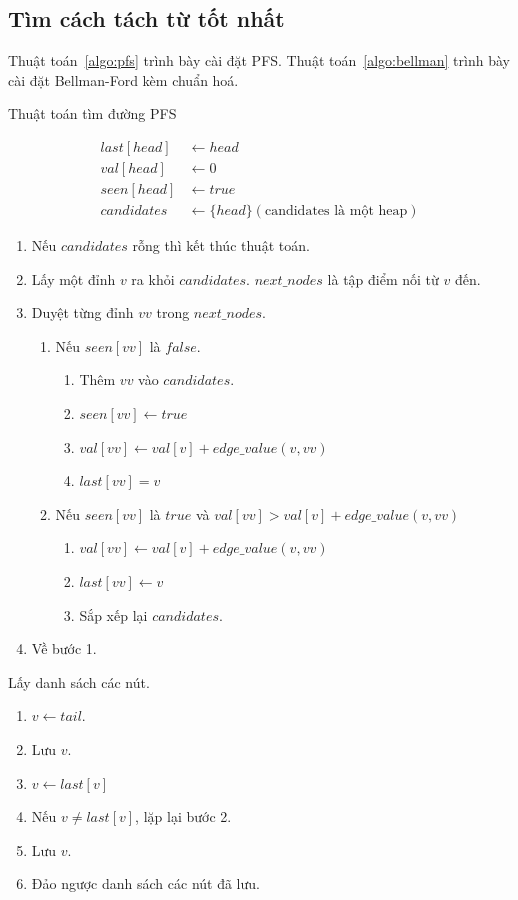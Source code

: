 \documentclass[a4paper,oneside,14pt]{extbook} %
\begin{document}
\subsection{Tìm cách tách từ tốt nhất}


Thuật toán~\ref{algo:pfs} trình bày cài đặt PFS. 
Thuật toán~\ref{algo:bellman} trình bày cài đặt Bellman-Ford kèm chuẩn hoá.


\begin{algo}
  \caption{Thuật toán tìm đường PFS}
  \label{algo:pfs}
  \begin{align*}
    last[head] &\leftarrow head\\
    val[head] &\leftarrow 0\\
    seen[head] &\leftarrow true\\
    candidates &\leftarrow \{ head \} (\text{candidates là một heap})
  \end{align*}

  \begin{enumerate}
  \item Nếu $candidates$ rỗng thì kết thúc thuật toán.
  \item Lấy một đỉnh $v$ ra khỏi $candidates$. $next\_nodes$ là tập điểm
    nối từ $v$ đến.
  \item Duyệt từng đỉnh $vv$ trong $next\_nodes$.
    \begin{enumerate}
    \item Nếu $seen[vv]$ là $false$.
      \begin{enumerate}
      \item Thêm $vv$ vào $candidates$.
      \item $seen[vv] \leftarrow true$
      \item $val[vv] \leftarrow val[v]+edge\_value(v,vv)$
      \item $last[vv] = v$
      \end{enumerate}
    \item Nếu $seen[vv]$ là $true$ và $val[vv] > val[v]+edge\_value(v,vv)$
      \begin{enumerate}
      \item $val[vv] \leftarrow val[v]+edge\_value(v,vv)$
      \item $last[vv] \leftarrow v$
      \item Sắp xếp lại $candidates$.
      \end{enumerate}
    \end{enumerate}
  \item Về bước 1.
  \end{enumerate}

Lấy danh sách các nút.
  \begin{enumerate}
  \item $v \leftarrow tail$.
  \item Lưu $v$.
  \item $v \leftarrow last[v]$
  \item Nếu $v \ne last[v]$, lặp lại bước 2.
  \item Lưu $v$.
  \item Đảo ngược danh sách các nút đã lưu.
  \end{enumerate}
\end{algo}
\end{document}
